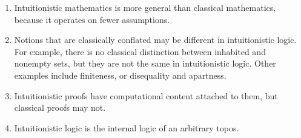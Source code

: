 \begin{remark}
    \begin{enumerate}
        \item Intuitionistic mathematics is more general than classical mathematics, because it operates on fewer assumptions.
        \item Notions that are classically conflated may be different in intuitionistic logic.
        For example, there is no classical distinction between inhabited and nonempty sets, but they are not the same in intuitionistic logic.
        Other examples include finiteness, or disequality and apartness.
        \item Intuitionistic proofs have computational content attached to them, but classical proofs may not.
        \item Intuitionistic logic is the internal logic of an arbitrary topos.
    \end{enumerate}
\end{remark}

